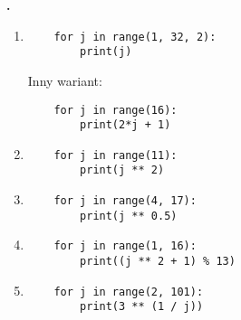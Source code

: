 \documentclass[a4paper]{article}
\begin{document}
\textbf{.}\addtocounter{zadanie}{1}
\lstset{numbers=none}
\begin{enumerate}[label=\arabic*.]
    \item \begin{lstlisting}
    for j in range(1, 32, 2):
        print(j)
    \end{lstlisting}
    Inny wariant:
    \begin{lstlisting}
    for j in range(16):
        print(2*j + 1)
    \end{lstlisting}

    \item \begin{lstlisting}
    for j in range(11):
        print(j ** 2)
    \end{lstlisting}

    \item \begin{lstlisting}
    for j in range(4, 17):
        print(j ** 0.5)
    \end{lstlisting}

    \item \begin{lstlisting}
    for j in range(1, 16):
        print((j ** 2 + 1) % 13)
    \end{lstlisting}

    \item \begin{lstlisting}
    for j in range(2, 101):
        print(3 ** (1 / j))
    \end{lstlisting}
\end{enumerate}
\end{document}
